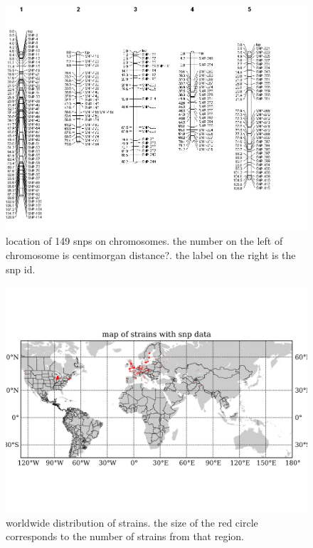 \documentclass[a4paper,10pt]{article}
\begin{document}
\begin{figure}
\includegraphics[width=1\textwidth]{figures/snp_locations_on_chr.png}
\caption{location of 149 snps on chromosomes. the number on the left of chromosome is centimorgan distance?. the label on the right is the snp id.}\label{f1}
\end{figure}

\begin{figure}
\includegraphics[angle=-90,width=1\textwidth]{figures/data_d110_c0_5_strain_map_with_data.png}
\caption{worldwide distribution of strains. the size of the red circle corresponds to the number of strains from that region.}\label{fdata1}
\end{figure}
\end{document}
